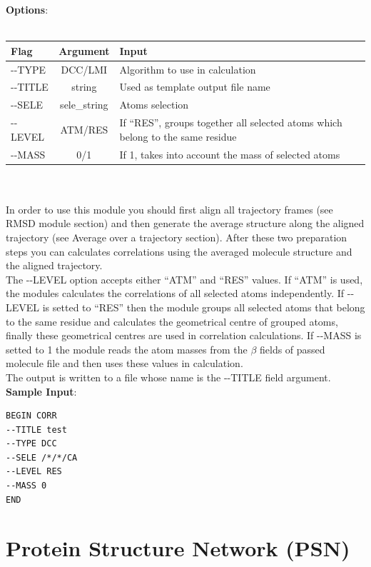 \documentclass[11pt,twoside,onecolumn,a4paper,openright,notitlepage]{book}[2001/04/21]
\begin{document}
\textbf{\large Options}:\\\\
\begin{tabular}{l|c|p{7.0cm}}
Flag & Argument & Input \\
\hline
-{}-TYPE          & DCC/LMI                       & Algorithm to use in calculation\\
-{}-TITLE         & string                        & Used as template output file name\\
-{}-SELE          & sele\_string                  & Atoms selection\\
-{}-LEVEL         & ATM/RES                       & If ``RES'', groups together all selected atoms which belong to the same residue\\
-{}-MASS          & 0/1                           & If 1, takes into account the mass of selected atoms\\
\end{tabular}\\\\

In order to use this module you should first align all trajectory frames (see RMSD module section) and then generate the average structure along the aligned trajectory (see Average over a trajectory section). After these two preparation steps you can calculates correlations using the averaged molecule structure and the aligned trajectory.\\
The -{}-LEVEL option accepts either ``ATM'' and ``RES'' values. If ``ATM'' is used, the modules calculates the correlations of all selected atoms independently. If -{}-LEVEL is setted to ``RES'' then the module groups all selected atoms that belong to the same residue and calculates the geometrical centre of grouped atoms, finally these geometrical centres are used in correlation calculations. If -{}-MASS is setted to 1 the module reads the atom masses from the $\beta{}$ fields of passed molecule file and then uses these values in calculation.\\
The output is written to a file whose name is the -{}-TITLE field argument.\\

\textbf{\large Sample Input}:
\begin{verbatim}
BEGIN CORR
--TITLE test
--TYPE DCC
--SELE /*/*/CA
--LEVEL RES
--MASS 0
END
\end{verbatim}
\clearpage

\section{Protein Structure Network (PSN)\label{psn}}
\end{document}
